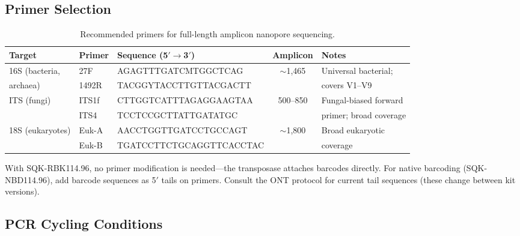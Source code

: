 \subsection{Primer Selection}
\label{subsec:protocols:primers}

\begin{table}[htbp]
\centering
\caption{Recommended primers for full-length amplicon nanopore sequencing.}
\label{tab:protocols:primers}
\small
\renewcommand{\arraystretch}{1.3}
\begin{tabularx}{\textwidth}{@{}l l l c X@{}}
\toprule
\textbf{Target} & \textbf{Primer} & \textbf{Sequence (5$'$$\to$3$'$)} & \textbf{Amplicon} & \textbf{Notes} \\
\midrule
16S (bacteria, & 27F & AGAGTTTGATCMTGGCTCAG & \multirow{2}{*}{$\sim$1,465\basepair{}} & Universal bacterial; \\
\quad archaea) & 1492R & TACGGYTACCTTGTTACGACTT & & covers V1--V9 \\
\addlinespace
ITS (fungi) & ITS1f & CTTGGTCATTTAGAGGAAGTAA & \multirow{2}{*}{500--850\basepair{}} & Fungal-biased forward \\
 & ITS4 & TCCTCCGCTTATTGATATGC & & primer; broad coverage \\
\addlinespace
18S (eukaryotes) & Euk-A & AACCTGGTTGATCCTGCCAGT & \multirow{2}{*}{$\sim$1,800\basepair{}} & Broad eukaryotic \\
 & Euk-B & TGATCCTTCTGCAGGTTCACCTAC & & coverage \\
\bottomrule
\end{tabularx}
\end{table}

\begin{tipbox}[title={Adding Barcode Tails to Primers}]
With SQK-RBK114.96, no primer modification is needed---the transposase attaches barcodes directly. For native barcoding (SQK-NBD114.96), add barcode sequences as 5$'$ tails on primers. Consult the \acrshort{ONT} protocol for current tail sequences (these change between kit versions).
\end{tipbox}

\subsection{PCR Cycling Conditions}
\label{subsec:protocols:pcr_cycling}


